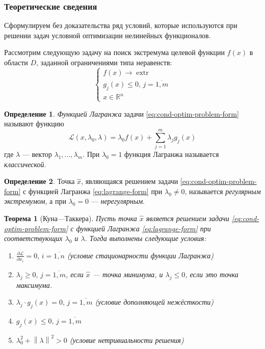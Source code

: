 \documentclass{article}
\renewcommand{\leq}{\leqslant}
\renewcommand{\geq}{\geqslant}
\newcommand{\La}{\mathcal{L}}
\newcommand{\neword}{\emph}
\newcommand{\pardiff}[2]{\frac{\partial{#1}}{\partial{#2}}}
\newcommand{\norm}[1]{\left \lVert{#1}\right \rVert}
\newcommand{\set}[1]{\mathbb{#1}}
\newcommand{\mul}{\cdot}
\DeclareMathOperator{\extr}{extr}
\newtheorem{thm}{Теорема}[section]
\theoremstyle{remark}
\theoremstyle{definition}
\newtheorem{dfn}{Определение}[section]
\numberwithin{equation}{section}
\begin{document}
\subsubsection{Теоретические сведения}

Сформулируем без доказательства ряд условий, которые используются при
решении задач условной оптимизации нелинейных функционалов. 

Рассмотрим следующую задачу на поиск экстремума целевой функции $f(x)$
в области $D$, заданной ограничениями типа неравенств:
\begin{equation}
  \label{eq:cond-optim-problem-form}
  \begin{cases}
    f(x) \to \extr \\
    g_j(x) \leq 0,\, j=\overline{1,m} \\
    x \in \set{R}^n
  \end{cases}
\end{equation}

\begin{dfn} \neword{Функцией Лагранжа} задачи
  \eqref{eq:cond-optim-problem-form} называют функцию
  \begin{equation}
    \label{eq:lagrange-form}
    \La(x, \lambda_0, \lambda) = \lambda_0 f(x) + \sum_{j=1}^m {\lambda_j g_j(x)}
  \end{equation}
  где $\lambda$ — вектор $\lambda_1, \dotsc, \lambda_m$. При
  $\lambda_0=1$ функция Лагранжа называется \neword{классической}.
\end{dfn}

\begin{dfn}
  \label{dfn:regular}
  Точка $\hat{x}$, являющаяся решением задачи
  \eqref{eq:cond-optim-problem-form} с функцией Лагранжа
  \eqref{eq:lagrange-form} при $\lambda_0 \neq 0$, называется
  \neword{регулярным экстремумом}, а при $\lambda_0 = 0$ —
  \neword{нерегулярным}.
\end{dfn}

\begin{thm}[Куна—Таккера]
  \label{th:kuhn-tucker}
  Пусть точка $\hat{x}$ является решением задачи
  \eqref{eq:cond-optim-problem-form} с функцией Лагранжа
  \eqref{eq:lagrange-form} при соответствующих $\lambda_0$ и
  $\lambda$. Тогда выполнены следующие условия:
  \begin{enumerate}
    \renewcommand{\labelenumi}{\emph{\asbuk{enumi})}}
  \item $\pardiff{\La}{x_i}=0,\, i=\overline{1,n}$ (условие
    стационарности функции Лагранжа)
  \item $\lambda_j \geq 0,\, j=\overline{1,m}$, если $\hat{x}$ — точка
    минимума, и $\lambda_j \leq 0$, если это точка максимума.
  \item $\lambda_j \mul g_j(x) = 0,\, j=\overline{1,m}$ (условие
    дополняющей нежёсткости)
  \item $g_j(x) \leq 0,\, j=\overline{1,m}$
  \item $\lambda_0^2 + \norm{\lambda}^2 > 0$ (условие нетривиальности решения)
  \end{enumerate}
\end{thm}
\end{document}
